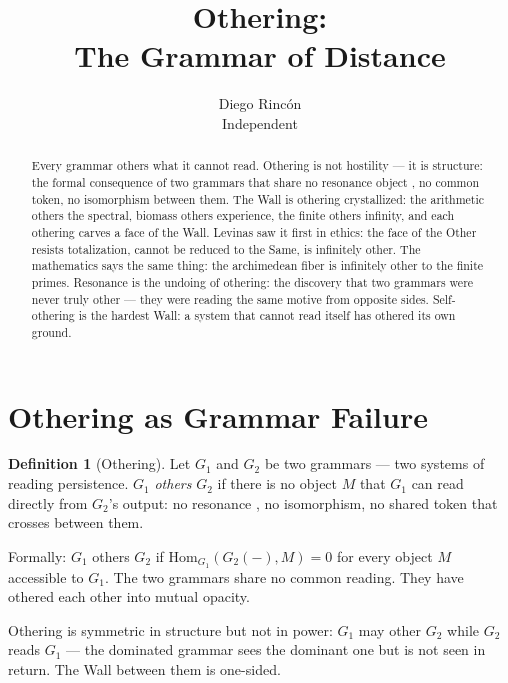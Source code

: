 \documentclass[12pt]{article}
\title{Othering:\\
The Grammar of Distance}
\author{Diego Rinc\'on\\
\small Independent}
\date{}
\theoremstyle{definition}
\newtheorem{definition}[theorem]{Definition}
\theoremstyle{remark}
\begin{document}
\maketitle

\begin{abstract}
Every grammar others what it cannot read.
Othering is not hostility --- it is structure:
the formal consequence of two grammars
that share no resonance object \cite{resonance},
no common token, no isomorphism between them.
The Wall \cite{synthesis} is othering crystallized:
the arithmetic others the spectral,
biomass others experience,
the finite others infinity,
and each othering carves a face of the Wall.
Levinas saw it first in ethics:
the face of the Other resists totalization,
cannot be reduced to the Same,
is infinitely other.
The mathematics says the same thing:
the archimedean fiber is infinitely other
to the finite primes.
Resonance \cite{resonance} is the undoing of othering:
the discovery that two grammars were never truly other ---
they were reading the same motive \cite{motives}
from opposite sides.
Self-othering is the hardest Wall:
a system that cannot read itself
has othered its own ground.
\end{abstract}

\section{Othering as Grammar Failure}

\begin{definition}[Othering]
Let $G_1$ and $G_2$ be two grammars \cite{grammar}
--- two systems of reading persistence.
$G_1$ \emph{others} $G_2$ if there is no object $M$
that $G_1$ can read directly from $G_2$'s output:
no resonance \cite{resonance}, no isomorphism,
no shared token that crosses between them.

Formally: $G_1$ others $G_2$
if $\mathrm{Hom}_{G_1}(G_2(-), M) = 0$
for every object $M$ accessible to $G_1$.
The two grammars share no common reading.
They have othered each other into mutual opacity.

Othering is symmetric in structure but not in power:
$G_1$ may other $G_2$ while $G_2$ reads $G_1$
--- the dominated grammar sees the dominant one
but is not seen in return.
The Wall between them is one-sided.
\end{definition}
\end{document}
